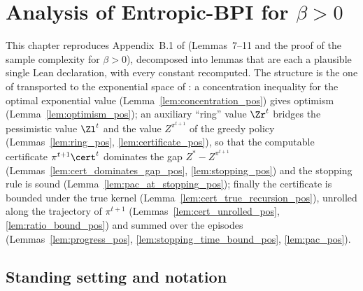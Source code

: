 \chapter{Analysis of Entropic-BPI for \texorpdfstring{$\beta > 0$}{beta > 0}}
\label{chap:analysis_pos}

This chapter reproduces Appendix~B.1 of \cite{essakine2026tight} (Lemmas~7--11 and the proof
of the sample complexity for $\beta > 0$), decomposed into lemmas that are each a plausible
single Lean declaration, with every constant recomputed. The structure is the one of
\cite{menard2021fast} transported to the exponential space of \cite{fei2021exponential}: a
concentration inequality for the optimal exponential value (Lemma~\ref{lem:concentration_pos})
gives optimism (Lemma~\ref{lem:optimism_pos}); an auxiliary ``ring'' value
$\Zr^t$ bridges the pessimistic value $\Zl^t$ and the value $Z^{\pi^{t+1}}$ of the greedy
policy (Lemmas~\ref{lem:ring_pos}, \ref{lem:certificate_pos}), so that the computable
certificate $\pi^{t+1}\cert^t$ dominates the gap $Z^* - Z^{\pi^{t+1}}$
(Lemmas~\ref{lem:cert_dominates_gap_pos}, \ref{lem:stopping_pos}) and the stopping rule is
sound (Lemma~\ref{lem:pac_at_stopping_pos}); finally the certificate is bounded under the true
kernel (Lemma~\ref{lem:cert_true_recursion_pos}), unrolled along the trajectory of $\pi^{t+1}$
(Lemmas~\ref{lem:cert_unrolled_pos}, \ref{lem:ratio_bound_pos}) and summed over the episodes
(Lemmas~\ref{lem:progress_pos}, \ref{lem:stopping_time_bound_pos}, \ref{lem:pac_pos}).

\section{Standing setting and notation}
\label{sec:pos_setting}

